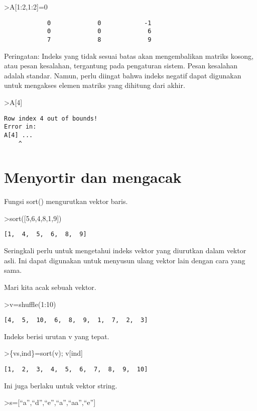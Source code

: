 \documentclass[
]{book}
\begin{document}
\textgreater A{[}1:2,1:2{]}=0

\begin{verbatim}
            0             0            -1 
            0             0             6 
            7             8             9 
\end{verbatim}

Peringatan: Indeks yang tidak sesuai batas akan mengembalikan matriks kosong, atau pesan kesalahan, tergantung pada pengaturan sistem. Pesan kesalahan adalah standar. Namun, perlu diingat bahwa indeks negatif dapat digunakan untuk mengakses elemen matriks yang dihitung dari akhir.

\textgreater A{[}4{]}

\begin{verbatim}
Row index 4 out of bounds!
Error in:
A[4] ...
    ^
\end{verbatim}

\chapter{Menyortir dan mengacak}\label{menyortir-dan-mengacak}

Fungsi sort() mengurutkan vektor baris.

\textgreater sort({[}5,6,4,8,1,9{]})

\begin{verbatim}
[1,  4,  5,  6,  8,  9]
\end{verbatim}

Seringkali perlu untuk mengetahui indeks vektor yang diurutkan dalam vektor asli. Ini dapat digunakan untuk menyusun ulang vektor lain dengan cara yang sama.

Mari kita acak sebuah vektor.

\textgreater v=shuffle(1:10)

\begin{verbatim}
[4,  5,  10,  6,  8,  9,  1,  7,  2,  3]
\end{verbatim}

Indeks berisi urutan v yang tepat.

\textgreater\{vs,ind\}=sort(v); v{[}ind{]}

\begin{verbatim}
[1,  2,  3,  4,  5,  6,  7,  8,  9,  10]
\end{verbatim}

Ini juga berlaku untuk vektor string.

\textgreater s={[}``a'',``d'',``e'',``a'',``aa'',``e''{]}
\end{document}
